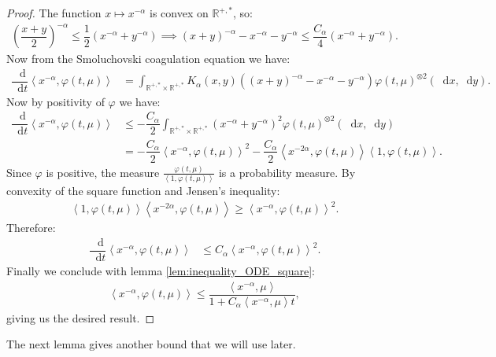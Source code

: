 \documentclass[11pt,a4paper]{article}
\newcommand{\RR}{\mathbb{R}}
\newcommand{\dd}{\mathop{}\!\mathrm{d}}
\begin{document}
\begin{proof}
    The function $x \mapsto x^{-\alpha}$ is convex on $\RR^{+,*}$, so:
    \begin{align*}
        \left(\dfrac{x + y}{2}\right)^{-\alpha} \leq \dfrac{1}{2}  \left(x^{-\alpha} + y^{-\alpha}\right) \implies 
        \left(x + y\right)^{-\alpha} - x^{-\alpha} - y^{-\alpha} \leq \dfrac{C_\alpha}{4} \left( x^{-\alpha} + y^{-\alpha}\right).
    \end{align*}
    Now from the Smoluchovski coagulation equation we have:
    \begin{align*}
        \dfrac{\dd}{\dd t} \left\langle x^{-\alpha},\varphi\left(t,\mu\right)\right\rangle &= \int_{\RR^{+,*}\times \RR^{+,*}} K_\alpha(x,y) \left((x + y)^{-\alpha}- x^{-\alpha} - y^{-\alpha} \right) \varphi\left(t,\mu\right)^{\otimes 2}(\dd x, \dd y).
    \end{align*}
    Now by positivity of $\varphi$ we have:
    \begin{align*}
        \dfrac{\dd}{\dd t} \left\langle x^{-\alpha},\varphi\left(t,\mu\right)\right\rangle &\leq -\dfrac{C_\alpha}{2}\int_{\RR^{+,*}\times \RR^{+,*}} \left(x^{-\alpha} + y^{-\alpha} \right)^2 \varphi\left(t,\mu\right)^{\otimes 2}(\dd x, \dd y)
        \\
        &= -\dfrac{C_\alpha}{2} \left\langle x^{-\alpha}, \varphi\left(t,\mu\right)\right\rangle^2 - \dfrac{C_\alpha}{2}\left\langle x^{-2\alpha}, \varphi\left(t,\mu\right)\right\rangle \left\langle 1, \varphi\left(t,\mu\right)\right\rangle.
    \end{align*}
   Since $\varphi$ is positive, the measure $\frac{\varphi\left(t,\mu\right)}{\left\langle 1, \varphi\left(t,\mu\right)\right\rangle}$ is a probability measure. By convexity of the square function and Jensen's inequality:
   \begin{align*}
       \left\langle 1, \varphi\left(t,\mu\right)\right\rangle\left\langle x^{-2\alpha}, \varphi\left(t,\mu\right)\right\rangle \geq \left\langle x^{-\alpha}, \varphi\left(t,\mu\right)\right\rangle^2.
   \end{align*}
   Therefore:
    \begin{align*}
        \dfrac{\dd}{\dd t} \left\langle x^{-\alpha},\varphi\left(t,\mu\right)\right\rangle &\leq C_\alpha \left\langle x^{-\alpha}, \varphi\left(t,\mu\right)\right\rangle^2.
    \end{align*}
    Finally we conclude with lemma \ref{lem:inequality_ODE_square}:
    \begin{align*}
        \left\langle x^{-\alpha},\varphi\left(t,\mu\right)\right\rangle \leq \dfrac{\left\langle x^{-\alpha}, \mu \right\rangle}{1 + C_\alpha\left\langle x^{-\alpha}, \mu \right\rangle t },
    \end{align*}
    giving us the desired result.
\end{proof}
The next lemma gives another bound that we will use later.
\end{document}
